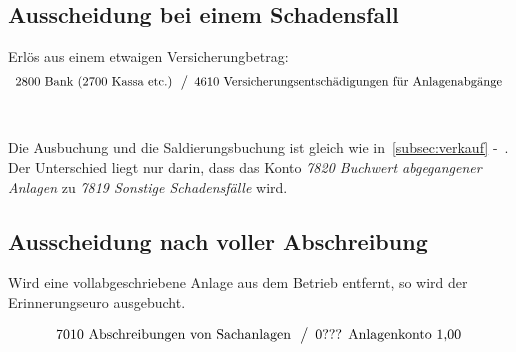 \documentclass[a4paper,9pt]{article}
\begin{document}
\subsection{Ausscheidung bei einem Schadensfall}
Erlös aus einem etwaigen Versicherungbetrag:
\begin{equation*}
  \begin{array}{l}
    \text{2800 Bank (2700 Kassa etc.)}\\
  \end{array}
  \left\slash
    \begin{array}{l}
      \text{4610 Versicherungsentschädigungen für Anlagenabgänge}\\
    \end{array}
  \right.
\end{equation*}\\
\\
Die Ausbuchung und die Saldierungsbuchung ist gleich wie
in~\autoref{subsec:verkauf} -~. Der
Unterschied liegt nur darin, dass das Konto \textit{7820 Buchwert
abgegangener Anlagen} zu \textit{7819 Sonstige Schadensfälle} wird.

\subsection{Ausscheidung nach voller Abschreibung}
Wird eine vollabgeschriebene Anlage aus dem Betrieb entfernt, so wird
der Erinnerungseuro ausgebucht.

\begin{equation*}
  \begin{array}{l}
    \text{7010 Abschreibungen von Sachanlagen}\\
  \end{array}
  \left\slash
    \begin{array}{l}
      \text{0??? Anlagenkonto 1,00}\\
    \end{array}
  \right.
\end{equation*}
\end{document}
